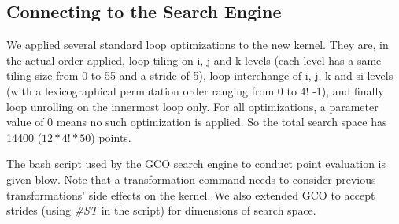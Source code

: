 \subsection{Connecting to the Search Engine}
We applied several standard loop optimizations to the new kernel.
They are, in the actual order applied,
loop tiling on i, j and k levels (each level has a same tiling size from 0
to 55 and a stride of 5),
loop interchange of i, j, k and si levels (with a lexicographical permutation order ranging from 0 to 4! -1),
and finally loop unrolling on the innermost loop only.
For all optimizations, a parameter
value of 0 means no such optimization is applied.
So the total search space has 14400 ($12*4!*50$) points.

The bash script used by the GCO search engine to conduct point evaluation is given blow. 
Note that a transformation command needs to consider previous transformations' side effects on the kernel. 
We also extended GCO to accept strides (using \textit{\#ST} in the script) for dimensions of search space.  

